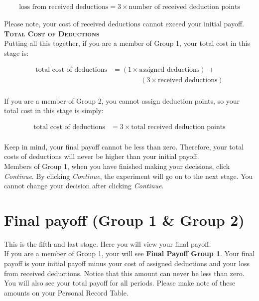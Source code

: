 \documentclass[12pt]{article}
\begin{document}
\begin{align*}
\text{loss from received deductions} = 3 \times \text{number of received deduction points}
\end{align*} 

Please note, your cost of received deductions cannot exceed your initial payoff.\\

{\bf \scshape Total Cost of Deductions}\\

Putting all this together, if you are a member of Group 1, your total cost in this stage is:

\begin{align*}
\text{total cost of deductions} &= (1 \times \text{assigned deductions}) ~ + \\
& \qquad \qquad (3 \times \text{received deductions})\\
\end{align*}

If you are a member of Group 2, you cannot assign deduction points, so your total cost in this stage is simply:

\begin{align*}
\text{total cost of deductions} &= 3 \times \text{total received deduction points}\\
\end{align*}

Keep in mind, your final payoff cannot be less than zero. Therefore, your total costs of deductions will never be higher than your initial payoff.\\

Members of Group 1, when you have finished making your decisions, click {\em Continue}.  By clicking {\em Continue}, the experiment will go on to the next stage.  You cannot change your decision after clicking {\em Continue}.

\newpage

\section{Final payoff (Group 1 \& Group 2)}

This is the fifth and last stage.  Here you will view your final payoff.\\

If you are a member of Group 1, your will see {\bf Final Payoff Group 1}.  Your final payoff is your initial payoff minus your cost of assigned deductions and your loss from received deductions.  Notice that this amount can never be less than zero.  You will also see your total payoff for all periods.  Please make note of these amounts on your Personal Record Table.\\
\end{document}
